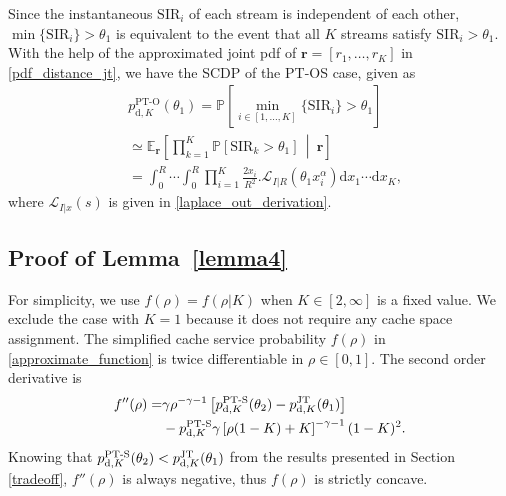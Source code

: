 \documentclass[twocolumns,10pt]{IEEEtran}
\begin{document}
Since the instantaneous $\text{SIR}_i$ of each stream is independent of each other,  $\min\{\text{SIR}_i\}>\theta_1$ is equivalent to the event that all $K$ streams satisfy $\text{SIR}_i>\theta_1$. With the help of the approximated joint pdf of $\mathbf{r}=[ r_1, \ldots, r_K]$ in \eqref{pdf_distance_jt},  we have the SCDP of the PT-OS case, given as
\begin{align}
& p_{\text{d},K}^{\text{PT-O}} (\theta_1)  = \mathbb{P}\left[\min\limits_{i\in[1,\ldots, K]}\{\text{SIR}_i\}> \theta_1 \right] \nonumber \\
&\simeq\mathbb{E}_{ \mathbf{r}}\left[\prod\limits_{k=1}^{K} \mathbb{P}\left[\text{SIR}_k>\theta_1 \right]\,\middle|\ \mathbf{r}\right]  \nonumber \\
&=  \int_{0}^{R}\cdots\int_{0}^{R}  \prod\limits_{i=1}^{K} \frac{2 x_i}{R^2}. \mathcal{L}_{I|R}\left(\theta_1 x_i^{\alpha}\right)\text{d}x_1 \cdots \text{d}x_K,
\end{align}  	
where $\mathcal{L}_{I|x}(s)$ is given in \eqref{laplace_out_derivation}.

\subsection{Proof of Lemma~\ref{lemma4} }
\label{appen4}
For simplicity, we use $f(\rho)=f(\rho|K)$ when $K\in[2, \infty]$ is a fixed value. We exclude the case with $K=1$ because it does not require any cache space assignment. 
The simplified cache service probability $f(\rho)$ in \eqref{approximate_function} is twice differentiable in $\rho\in[0,1]$. The second order derivative is
\begin{equation}
\begin{split}
f''(\rho)=&\gamma \rho^{-\gamma-1} \left[p_{\textnormal{d},K}^{\text{PT-S}} (\theta_2) -p_{\textnormal{d},K}^{\text{JT}}  (\theta_1)\right]\\
& -p_{\textnormal{d},K}^{\text{PT-S}} \gamma \left[\rho(1-K)+K\right]^{-\gamma-1} (1-K)^2.
\end{split}
\end{equation}
Knowing that  $p_{\textnormal{d},K}^{\text{PT-S}} (\theta_2) < p_{\text{d},K}^{\text{JT}} (\theta_1)$ from the results presented in Section \ref{tradeoff}, $f''(\rho)$ is always negative, thus $f(\rho)$ is strictly concave.
\end{document}
